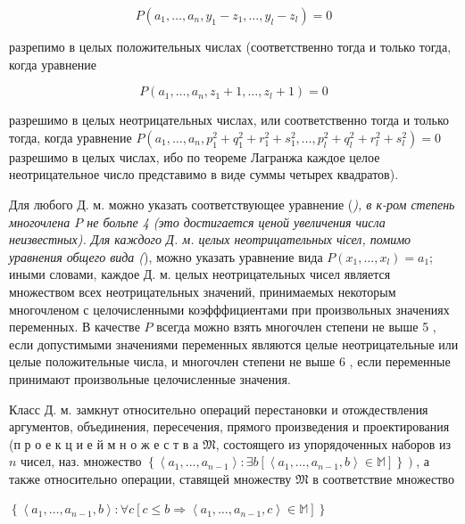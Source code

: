 \documentclass[10pt]{article}
\begin{document}
\[

P\left(a_{1}, \ldots, a_{n}, y_{1}-z_{1}, \ldots, y_{l}-z_{l}\right)=0

\]



разрепимо в целых положительных числах (соответственно тогда и только тогда, когда уравнение



\[

P\left(a_{1}, \ldots, a_{n}, z_{1}+1, \ldots, z_{l}+1\right)=0

\]



разрешимо в целых неотрицательных числах, или соответственно тогда и только тогда, когда уравнение $P\left(a_{1}, \ldots, a_{n}, p_{1}^{2}+q_{1}^{2}+r_{1}^{2}+s_{1}^{2}, \ldots, p_{l}^{2}+q_{l}^{2}+r_{l}^{2}+s_{l}^{2}\right)=0$ разрешимо в целых числах, ибо по теореме Лагранжа каждое целое неотрицательное число представимо в виде суммы четырех квадратов).



Для любого Д. м. можно указать соответствующее уравнение (\textit{), в к-ром степень многочлена $P$ не больпе 4 (это достигается ценой увеличения числа неизвестных). Для каждого Д. м. целых неотрицательных чісел, помимо уравнения общего вида (}), можно указать уравнение вида $P\left(x_{1}, \ldots, x_{l}\right)=a_{1}$; иными словами, каждое Д. м. целых неотрицательных чисел является множеством всех неотрицательных значений, принимаемых некоторым многочленом с целочисленными коэфффициентами при произвольных значениях переменных. В качестве $P$ всегда можно взять многочлен степени не выше 5 , если допустимыми значениями переменных являются целые неотрицательные или целые положительные числа, и многочлен степени не выше 6 , если переменные принимают произвольные целочисленные значения.



Класс Д. м. замкнут относительно операций перестановки и отождествления аргументов, объединения, пересечения, прямого произведения и проектирования (п р о е к ц и е й м н о ж е с т в а $\mathfrak{M}$, состоящего из упорядоченных наборов из $n$ чисел, наз. множество $\left.\left\{\left\langle a_{1}, \ldots, a_{n-1}\right\rangle: \exists b\left[\left\langle a_{1}, \ldots, a_{n-1}, b\right\rangle \in \mathbb{M}\right]\right\}\right)$, а также относительно операции, ставящей множеству $\mathfrak{M}$ в соответствие множество



$\left\{\left\langle a_{1}, \ldots, a_{n-1}, b\right\rangle: \forall c\left[c \leqslant b \Rightarrow\left\langle a_{1}, \ldots, a_{n-1}, c\right\rangle \in \mathbb{M}\right]\right\}$
\end{document}
